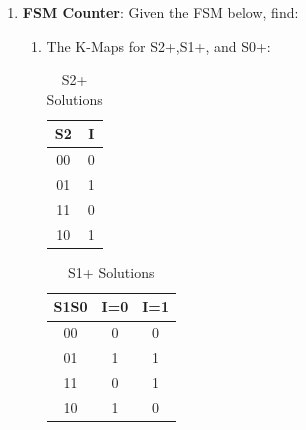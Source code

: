 \documentclass{article}
\begin{document}
\begin{enumerate}[label=(\alph*)]
\begin{multicols}{2}
\begin{center}
        \end{center}
        \columnbreak
        \end{multicols}
        \newpage
        \item \textbf{FSM Counter}: Given the FSM below, find:
        \begin{enumerate}[label=(\roman*),nolistsep]
            \item The K-Maps for S2+,S1+, and S0+:
            \newline
\begin{table}[h]
\centering
\begin{tabular}{|c|c|}
\hline
S2 & I \\
\hline
00 & 0 \\
01 & 1 \\
11 & 0 \\
10 & 1 \\
\hline
\end{tabular}
\caption{S2+ Solutions}
\end{table}

\begin{table}[h]
\centering
\begin{tabular}{|c|c|c|}
\hline
S1S0 & I=0 & I=1 \\
\hline
00 & 0 & 0 \\
01 & 1 & 1 \\
11 & 0 & 1 \\
10 & 1 & 0 \\
\hline
\end{tabular}
\caption{S1+ Solutions}
\end{table}


\end{enumerate}
\end{enumerate}
\end{document}
